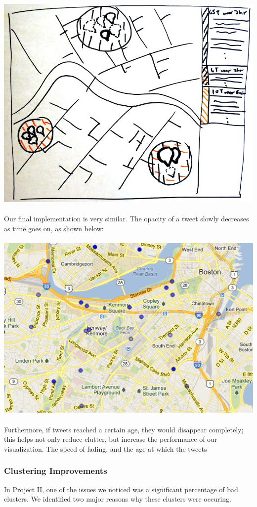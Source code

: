 \documentclass[pdftex,12pt,a4paper]{article}
\begin{document}
\includegraphics[width=5.5in]{pheme4.jpg} \\ \\
Our final implementation is very similar. The opacity of a tweet slowly decreases as time goes on, as shown below: \\ \\
\includegraphics[width=5.5in]{fading.png} \\ \\
Furthermore, if tweets reached a certain age, they would disappear completely; this helps not only reduce clutter, but increase the performance of our visualization. The speed of fading, and the age at which the tweets 

\subsubsection{Clustering Improvements}
In Project II, one of the issues we noticed was a significant percentage of bad clusters. We identified two major reasons why these clusters were occuring. 
\end{document}
